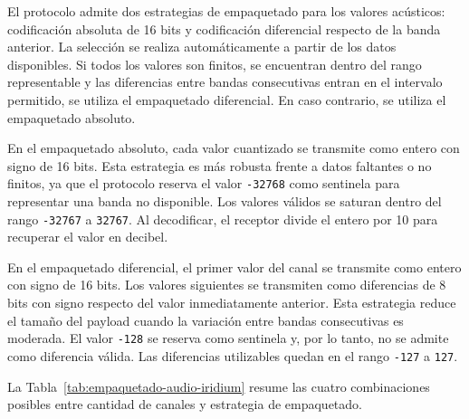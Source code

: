 El protocolo admite dos estrategias de empaquetado para los valores acústicos: codificación absoluta de 16 bits y codificación diferencial respecto de la banda anterior. La selección se realiza automáticamente a partir de los datos disponibles. Si todos los valores son finitos, se encuentran dentro del rango representable y las diferencias entre bandas consecutivas entran en el intervalo permitido, se utiliza el empaquetado diferencial. En caso contrario, se utiliza el empaquetado absoluto.

En el empaquetado absoluto, cada valor cuantizado se transmite como entero con signo de 16 bits. Esta estrategia es más robusta frente a datos faltantes o no finitos, ya que el protocolo reserva el valor \texttt{-32768} como sentinela para representar una banda no disponible. Los valores válidos se saturan dentro del rango \texttt{-32767} a \texttt{32767}. Al decodificar, el receptor divide el entero por 10 para recuperar el valor en decibel.

En el empaquetado diferencial, el primer valor del canal se transmite como entero con signo de 16 bits. Los valores siguientes se transmiten como diferencias de 8 bits con signo respecto del valor inmediatamente anterior. Esta estrategia reduce el tamaño del payload cuando la variación entre bandas consecutivas es moderada. El valor \texttt{-128} se reserva como sentinela y, por lo tanto, no se admite como diferencia válida. Las diferencias utilizables quedan en el rango \texttt{-127} a \texttt{127}.

La Tabla~\ref{tab:empaquetado-audio-iridium} resume las cuatro combinaciones posibles entre cantidad de canales y estrategia de empaquetado.


